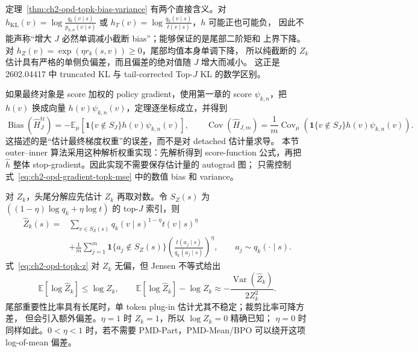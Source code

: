 \documentclass[lang=cn,scheme=chinese,openany]{../book/elegantbook}
\begin{document}
定理~\ref{thm:ch2-opd-topk-bias-variance} 有两个直接含义。对 $h_{\mathrm{KL}}(v)=\log\frac{q_k(v\mid s)}{p_{k,n}(v\mid s)}$ 或 $h_T(v)=\log\frac{q_k(v\mid s)}{t(v\mid s)}$，$h$ 可能正也可能负， 因此不能声称“增大 $J$ 必然单调减小截断 bias”；能够保证的是尾部二阶矩和 上界下降。对 $h_Z(v)=\exp(\eta r_k(s,v))\ge0$，尾部均值本身单调下降， 所以纯截断的 $Z_k$ 估计具有严格的单侧负偏差，而且偏差的绝对值随 $J$ 增大而减小。 这正是 2602.04417 中 truncated KL 与 tail-corrected Top-$J$ KL 的数学区别。

如果最终对象是 score 加权的 policy gradient，使用第一章的 score $\psi_{k,n}$，把 $h(v)$ 换成向量 $h(v)\psi_{k,n}(v)$，定理逐坐标成立，并得到
\begin{equation}
\operatorname{Bias}(\widehat H_J^{\mathrm{tr}})
 =-\mathbb E_\mu[\mathbf 1\{v\notin S_J\}h(v)\psi_{k,n}(v)],
\qquad
\operatorname{Cov}(\widehat H_{J,m})
 =\frac1m\operatorname{Cov}_\mu(\mathbf 1\{v\notin S_J\}h(v)\psi_{k,n}(v)).
\label{eq:ch2-opd-gradient-topk-mse}
\end{equation}
这描述的是“估计最终梯度权重”的误差，而不是对 detached 估计量求导。 本节 outer--inner 算法采用这种解析权重实现：先解析得到 score-function 公式，再把 $\widehat h$ 整体 stop-gradient。因此实现不需要保存估计量的 autograd 图； 只需控制式~\eqref{eq:ch2-opd-gradient-topk-mse} 中的数值 bias 和 variance。

对 $Z_k$，头尾分解应先估计 $Z_k$ 再取对数。令 $S_Z(s)$ 为 $((1-\eta)\log q_k+\eta\log t)$ 的 top-$J$ 索引，则
\begin{align}
\widehat Z_k(s)
={}&\sum_{v\in S_Z(s)}q_k(v\mid s)^{1-\eta}t(v\mid s)^\eta\\
&+\frac1m\sum_{j=1}^{m}\mathbf 1\{a_j\notin S_Z(s)\}
\left(\frac{t(a_j\mid s)}{q_k(a_j\mid s)}\right)^\eta,
\qquad a_j\sim q_k(\cdot\mid s).
\label{eq:ch2-opd-topk-z}
\end{align}
式~\eqref{eq:ch2-opd-topk-z} 对 $Z_k$ 无偏，但 Jensen 不等式给出
\begin{equation}
\mathbb E[\log\widehat Z_k]\leq\log Z_k,
\qquad
\mathbb E[\log\widehat Z_k]-\log Z_k
\approx-\frac{\operatorname{Var}(\widehat Z_k)}{2Z_k^2}.
\end{equation}
尾部重要性比率具有长尾时，单 token plug-in 估计尤其不稳定；裁剪比率可降方差， 但会引入额外偏差。$\eta=1$ 时 $Z_k=1$，所以 $\log Z_k=0$ 精确已知； $\eta=0$ 时同样如此。$0<\eta<1$ 时，若不需要 PMD-Part，PMD-Mean/BPO 可以绕开这项 log-of-mean 偏差。
\end{document}
